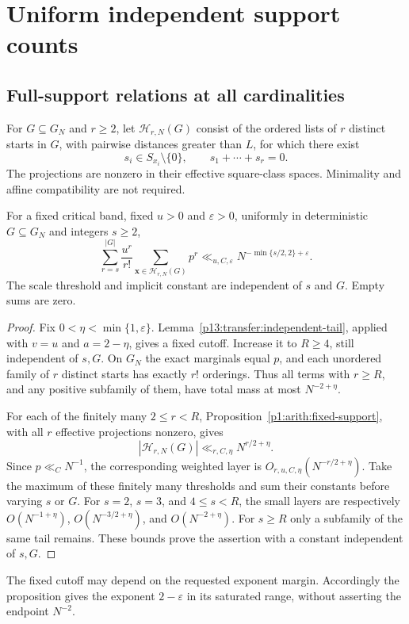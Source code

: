 \section{Uniform independent support counts}
\label{p1:uniform:appendix}

\subsection{Full-support relations at all cardinalities}

For $G\subseteq G_N$ and $r\ge2$, let $\mathcal H_{r,N}(G)$ consist
of the ordered lists of $r$ distinct starts in $G$, with pairwise
distances greater than $L$, for which there exist
\[
 s_i\in S_{x_i}\setminus\{0\},\qquad s_1+\cdots+s_r=0.
\]
The projections are nonzero in their effective square-class spaces.
Minimality and affine compatibility are not required.

\begin{proposition}
\label{p1:uniform:full-support}
For a fixed critical band, fixed $u>0$ and $\varepsilon>0$, uniformly
in deterministic $G\subseteq G_N$ and integers $s\ge2$,
\begin{equation}
 \sum_{r=s}^{|G|}\frac{u^r}{r!}
     \sum_{\boldsymbol x\in\mathcal H_{r,N}(G)}p^r
       \ll_{u,C,\varepsilon}N^{-\min\{s/2,2\}+\varepsilon}.
 \label{p2:uniform:full-support-bound}
\end{equation}
The scale threshold and implicit constant are independent of $s$ and $G$.
Empty sums are zero.
\end{proposition}

\begin{proof}
Fix $0<\eta<\min\{1,\varepsilon\}$.
Lemma~\ref{p13:transfer:independent-tail}, applied with $v=u$ and
$a=2-\eta$, gives a fixed cutoff. Increase it to $R\ge4$, still
independent of $s,G$. On $G_N$ the exact marginals equal $p$, and each
unordered family of $r$ distinct starts has exactly $r!$ orderings.
Thus all terms with $r\ge R$, and any positive subfamily of them,
have total mass at most $N^{-2+\eta}$.

For each of the finitely many $2\le r<R$,
Proposition~\ref{p1:arith:fixed-support}, with all $r$ effective
projections nonzero, gives
\[
 |\mathcal H_{r,N}(G)|\ll_{r,C,\eta}N^{r/2+\eta}.
\]
Since $p\ll_C N^{-1}$, the corresponding weighted layer is
$O_{r,u,C,\eta}(N^{-r/2+\eta})$.
Take the maximum of these finitely many thresholds and sum their
constants before varying $s$ or $G$.
For $s=2$, $s=3$, and $4\le s<R$, the small layers are respectively
$O(N^{-1+\eta})$, $O(N^{-3/2+\eta})$, and $O(N^{-2+\eta})$.
For $s\ge R$ only a subfamily of the same tail remains.
These bounds prove the assertion with a constant independent of $s,G$.
\end{proof}

The fixed cutoff may depend on the requested exponent margin.
Accordingly the proposition gives the exponent $2-\varepsilon$ in
its saturated range, without asserting the endpoint $N^{-2}$.
